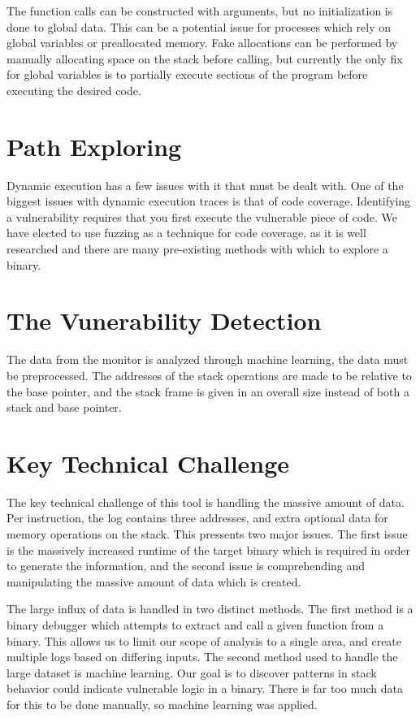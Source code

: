 \documentclass{article} \usepackage{graphicx}
\begin{document}
The function calls can be constructed with arguments, but no initialization is
done to global data. This can be a potential issue for processes which rely on
global variables or preallocated memory. Fake allocations can be performed by
manually allocating space on the stack before calling, but currently the only
fix for global variables is to partially execute sections of the program before
executing the desired code.


\section {Path Exploring} Dynamic execution has a few issues with it that must
be dealt with. One of the biggest issues with dynamic execution traces is that
of code coverage. Identifying a vulnerability requires that you first execute
the vulnerable piece of code. We have elected to use fuzzing as a technique for
code coverage, as it is well researched and there are many pre-existing methods
with which to explore a binary.

\section {The Vunerability Detection} The data from the monitor is analyzed
through machine learning, the data must be preprocessed. The addresses of the
stack operations are made to be relative to the base pointer, and the stack
frame is given in an overall size instead of both a stack and base pointer.

\section{Key Technical Challenge}

The key technical challenge of this tool is handling the massive amount of data.
Per instruction, the log contains three addresses, and extra optional data for
memory operations on the stack. This pressents two major issues. The first issue
is the massively increased runtime of the target binary which is required in
order to generate the information, and the second issue is comprehending and
manipulating the massive amount of data which is created.

The large influx of data is handled in two distinct methods. The first method is
a binary debugger which attempts to extract and call a given function from a
binary. This allows us to limit our scope of analysis to a single area, and
create multiple logs based on differing inputs. The second method used to handle
the large dataset is machine learning. Our goal is to discover patterns in stack
behavior could indicate vulnerable logic in a binary. There is far too much data
for this to be done manually, so machine learning was applied.
\end{document}
